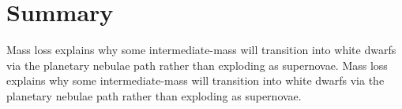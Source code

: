 \documentclass[twocolumn]{aastex63}
\begin{document}
\section{Summary}\label{sec:summary}


\lipsum[2-3]

Mass loss explains why some intermediate-mass will transition into white dwarfs via the planetary nebulae path rather than exploding as supernovae. Mass loss explains why some intermediate-mass will transition into white dwarfs via the planetary nebulae path rather than exploding as supernovae. 






\nocite{*}

\end{document}
